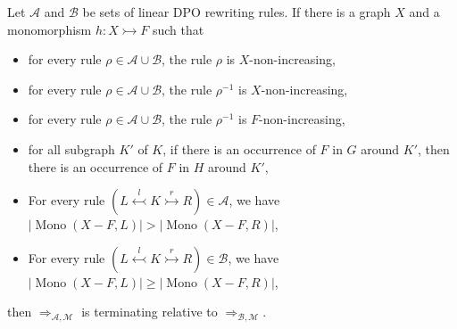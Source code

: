 \begin{theorem}
    \label{thm:termination_grs_ext1} 
    Let \(\mathcal{A}\) and \(\mathcal{B}\) be sets of linear DPO rewriting rules. If there is a graph \(X\) and a monomorphism $h: X \rightarrowtail F$ such that
    \begin{itemize}
        \item for every rule $\rho \mathop{\in} \mathcal{A} \mathop{\cup} \mathcal{B}$, the rule $\rho$ is $X$-non-increasing,
        \item for every rule $\rho \mathop{\in} \mathcal{A} \mathop{\cup} \mathcal{B}$, the rule $\rho^{-1}$ is $X$-non-increasing,
        \item for every rule \(\rho \mathop{\in} \mathcal{A} \mathop{\cup} \mathcal{B}\), the rule $\rho^{-1}$ is $F$-non-increasing,
        \item for all subgraph $K'$ of $K$, if there is an occurrence of $F$ in $G$ around $K'$, then there is an occurrence of $F$ in $H$ around $K'$,
        \item For every rule \(\left( L \overset{l}{\leftarrowtail} K \overset{r}{\rightarrowtail} R \right) \mathop{\in} \mathcal{A}\), we have \(|\operatorname{Mono}(X-F,L)| \mathop{>} |\operatorname{Mono}(X-F,R)|\),
        \item For every rule \(\left( L \overset{l}{\leftarrowtail} K \overset{r}{\rightarrowtail} R \right) \mathop{\in} \mathcal{B}\), we have \(|\operatorname{Mono}(X-F,L)| \mathop{\geq} |\operatorname{Mono}(X-F,R)|\),
    
    \end{itemize}
    then \(\mathop{\Rightarrow}_{\mathcal{A},\mathcal{M}}\) is terminating relative to \(\mathop{\Rightarrow}_{\mathcal{B},\mathcal{M}}\).
\end{theorem}



